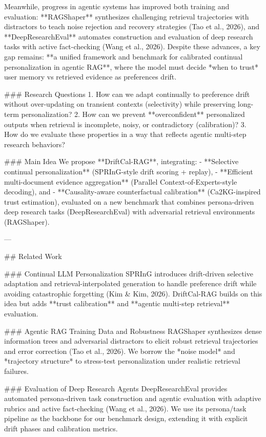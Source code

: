 Meanwhile, progress in agentic systems has improved both training and evaluation: **RAGShaper** synthesizes challenging retrieval trajectories with distractors to teach noise rejection and recovery strategies (Tao et al., 2026), and **DeepResearchEval** automates construction and evaluation of deep research tasks with active fact-checking (Wang et al., 2026). Despite these advances, a key gap remains: **a unified framework and benchmark for calibrated continual personalization in agentic RAG**, where the model must decide *when to trust* user memory vs retrieved evidence as preferences drift.

### Research Questions  
1. How can we adapt continually to preference drift without over-updating on transient contexts (selectivity) while preserving long-term personalization?  
2. How can we prevent **overconfident** personalized outputs when retrieval is incomplete, noisy, or contradictory (calibration)?  
3. How do we evaluate these properties in a way that reflects agentic multi-step research behaviors?

### Main Idea  
We propose **DriftCal-RAG**, integrating:  
- **Selective continual personalization** (SPRInG-style drift scoring + replay),  
- **Efficient multi-document evidence aggregation** (Parallel Context-of-Experts-style decoding), and  
- **Causality-aware counterfactual calibration** (Ca2KG-inspired trust estimation),  
evaluated on a new benchmark that combines persona-driven deep research tasks (DeepResearchEval) with adversarial retrieval environments (RAGShaper).

---

## Related Work  

### Continual LLM Personalization  
SPRInG introduces drift-driven selective adaptation and retrieval-interpolated generation to handle preference drift while avoiding catastrophic forgetting (Kim & Kim, 2026). DriftCal-RAG builds on this idea but adds **trust calibration** and **agentic multi-step retrieval** evaluation.

### Agentic RAG Training Data and Robustness  
RAGShaper synthesizes dense information trees and adversarial distractors to elicit robust retrieval trajectories and error correction (Tao et al., 2026). We borrow the *noise model* and *trajectory structure* to stress-test personalization under realistic retrieval failures.

### Evaluation of Deep Research Agents  
DeepResearchEval provides automated persona-driven task construction and agentic evaluation with adaptive rubrics and active fact-checking (Wang et al., 2026). We use its persona/task pipeline as the backbone for our benchmark design, extending it with explicit drift phases and calibration metrics.

